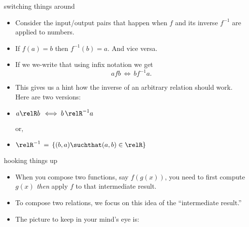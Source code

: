 \documentclass[handout,landscape]{beamer}
\begin{document}
\begin{frame}{switching things around}
\begin{itemize}
\item Consider the input/output pairs that happen when $f$ and its inverse $f^{-1}$ are applied to numbers. \pause
\item If $f(a) = b$ then $f^{-1}(b) = a$.  \pause And vice versa. \pause
\item If we we-write that using infix notation we get 
\[ afb \, \iff \, bf^{-1}a. \] \pause
\item This gives us a hint how the inverse of an arbitrary relation should work. \newline
Here are two versions: \pause
\item $\displaystyle a \relR b \, \iff b \, \relR^{-1} a$ \pause

\centerline{or,} \pause

\item $\displaystyle \relR^{-1} \, = \, \{ (b,a) \suchthat (a,b) \in \relR \}$ \pause
\end{itemize}
\end{frame}

\begin{frame}{hooking things up}
\begin{itemize}
\item When you compose two functions, say $f(g(x))$, you need to first compute $g(x)$ \pause \newline
{\em then} apply $f$ to that intermediate result. \pause
\item To compose two relations, we focus on this idea of the ``intermediate result.'' \pause
\item The picture to keep in your mind's eye is: \pause

\begin{center}

\end{center}

\end{itemize}
\end{frame}
\end{document}
